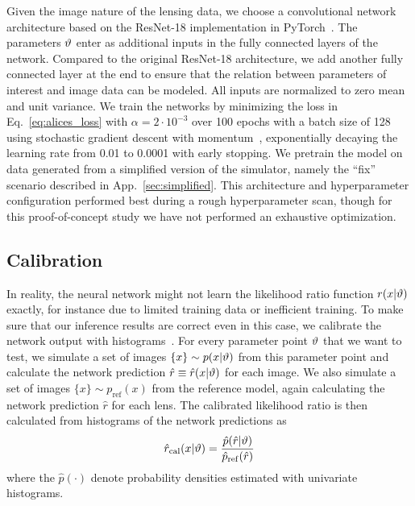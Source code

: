 \documentclass[twocolumn]{aastex62}
\begin{document}
Given the image nature of the lensing data, we choose a convolutional network architecture based on the ResNet-18 \citep{he2016deep} implementation in PyTorch~\citep{paszke2017automatic}. The parameters $\vartheta$ enter as additional inputs in the fully connected layers of the network. Compared to the original ResNet-18 architecture, we add another fully connected layer at the end to ensure that the relation between parameters of interest and image data can be modeled. All inputs are normalized to zero mean and unit variance. We train the networks by minimizing the loss in Eq.~\eqref{eq:alices_loss} with $\alpha = 2 \cdot 10^{-3}$ over 100 epochs with a batch size of 128 using stochastic gradient descent with momentum~\citep{Qian:1999:MTG:307343.307376}, exponentially decaying the learning rate from 0.01 to 0.0001 with early stopping. We pretrain the model on data generated from a simplified version of the simulator, namely the ``fix'' scenario described in App.~\ref{sec:simplified}. This architecture and hyperparameter configuration performed best during a rough hyperparameter scan, though for this proof-of-concept study we have not performed an exhaustive optimization.


\subsection{Calibration}
\label{sec:lfi-calibration}

In reality, the neural network might not learn the likelihood ratio function $r(x|\vartheta)$ exactly, for instance due to limited training data or inefficient training. To make sure that our inference results are correct even in this case, we calibrate the network output with histograms~\citep{Cranmer:2015bka, 1805.00020}. For every parameter point $\vartheta$ that we want to test, we simulate a set of images $\{x\} \sim p(x|\vartheta)$ from this parameter point and calculate the network prediction $\hat{r} \equiv \hat{r}(x|\vartheta)$ for each image. We also simulate a set of images $\{x\} \sim p_{\mathrm{ref}}(x)$ from the reference model, again calculating the network prediction $\hat{r}$ for each lens. The calibrated likelihood ratio is then calculated from histograms of the network predictions as
%
\begin{equation}
  \hat{r}_\mathrm{cal}(x|\stattheta)
  = \frac {\hat{p}( \hat{r} | \stattheta )} {\hat{p}_\mathrm{ref}(\hat{r})}
\end{equation}
%
where the $\hat{p}(\cdot)$ denote probability densities estimated with univariate histograms.
\end{document}
